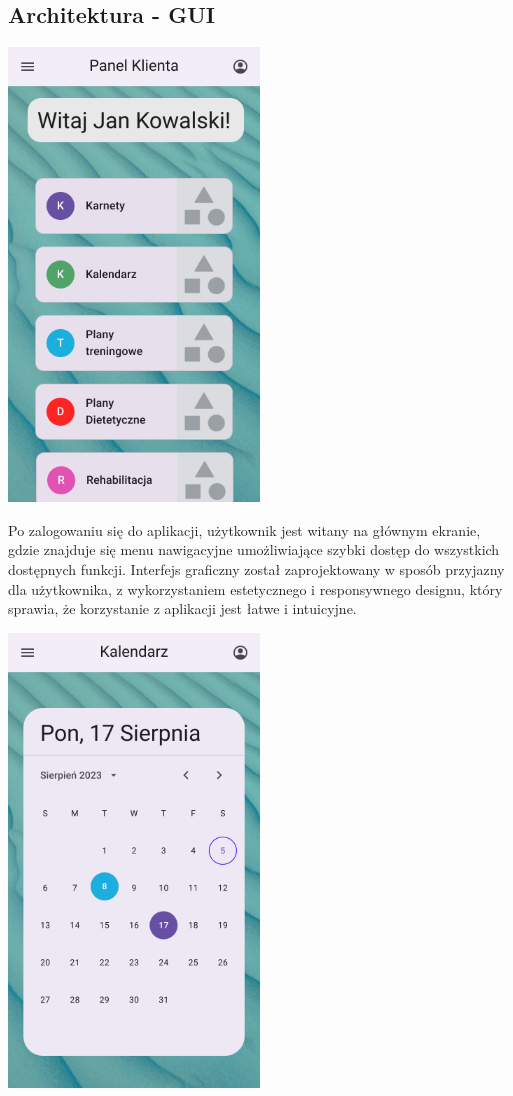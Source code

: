 \subsection{Architektura - GUI}\label{subsec:architektura-gui}

\includegraphics[width=0.5\textwidth]{latex/gui/main.png}

{Po zalogowaniu się do aplikacji, użytkownik jest witany na głównym ekranie, gdzie znajduje się menu nawigacyjne umożliwiające szybki dostęp do wszystkich dostępnych funkcji. Interfejs graficzny został zaprojektowany w sposób przyjazny dla użytkownika, z wykorzystaniem estetycznego i responsywnego designu, który sprawia, że korzystanie z aplikacji jest łatwe i intuicyjne.}

\includegraphics[width=0.5\textwidth]{latex/gui/calendar.png}

